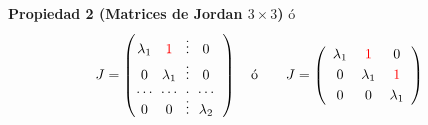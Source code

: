 {\begin{frame}
\begin{prop}{\textbf{Propiedad 2 (Matrices de Jordan $3\times 3$)}}
	\vspace{-2mm}
	ó
	\[
	J =
	\left(
	\begin{array}{@{\hspace{0.1\tabcolsep}}c@{\hspace{\tabcolsep}}c@{\hspace{\tabcolsep}}c@{\hspace{\tabcolsep}}c@{\hspace{\tabcolsep}}c@{\hspace{0.1\tabcolsep}}}
	\lambda_1 & {\color{red}1} & \vdots & 0 \\[0mm]
	0 & \lambda_1 & \vdots & 0 \\[-0mm]
	\cdots & \cdots  & \cdot & \cdots \\[-2mm]
	0 & 0 & \vdots & \lambda_2 \\
	\end{array}
	\right) 	
	\quad \text{ó} \qquad
	J =
	\left(
	\begin{array}{ccc}
	\lambda_1 & {\color{red}1} & 0\\[1mm]
	0 & \lambda_1 & {\color{red}1}\\[1mm]
	0 & 0 & \lambda_1
	\end{array}
	\right)
	\]
\end{prop}

\end{frame}
}


\subsection{} 

